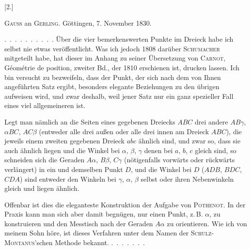 
\begin{center}
[2.]
\end{center}

\begin{center}
\textsc{Gauss} an \textsc{Gerling}. Göttingen, 7. November 1830.
\end{center}

\indent\mbox{. . . . . . . . . .} Über die vier bemerkenswerten Punkte im Dreieck
habe ich selbst nie etwas veröffentlicht. Was ich jedoch 1808 darüber
\textsc{Schumacher} mitgeteilt habe, hat dieser im Anhang zu seiner
Übersetzung von \textsc{Carnot}, Géométrie de position, zweiter
Bd., der 1810 erschienen ist, drucken lassen. Ich bin versucht zu bezweifeln, dass
der Punkt, der sich nach dem von Ihnen angeführten Satz ergibt,
besonders elegante Beziehungen zu den übrigen aufweisen wird, und zwar
deshalb, weil jener Satz nur ein ganz spezieller Fall eines viel
allgemeineren ist.

Legt man nämlich an die Seiten eines gegebenen Dreiecks $ABC$
drei andere $AB\gamma$, $\alpha BC$, $AC\beta$ (entweder alle drei
außen oder alle drei innen am Dreieck
$ABC$), die jeweils einem zweiten gegebenen Dreieck $abc$ ähnlich
sind, und zwar so, dass sie auch ähnlich liegen und die Winkel bei
$\alpha$, $\beta$, $\gamma$ denen bei $a$, $b$, $c$ gleich sind, so
schneiden sich die Geraden $A\alpha$, $B\beta$, $C\gamma$
(nötigenfalls vorwärts oder rückwärts verlängert) in ein und demselben Punkt
$D$, und die Winkel bei $D$ ($ADB$, $BDC$, $CDA$) sind
entweder den Winkeln bei $\gamma$, $\alpha$, $\beta$ selbst oder ihren
Nebenwinkeln gleich und liegen ähnlich.

Offenbar ist dies die eleganteste Konstruktion der
Aufgabe von \textsc{Pothenot}. In der Praxis kann man sich aber damit begnügen,
nur einen Punkt, z.\,B. $\alpha$, zu konstruieren und den Messtisch nach
der Geraden $A\alpha$ zu orientieren. Wie ich von meinem Sohn höre, ist
dieses Verfahren unter dem Namen der \textsc{Schulz-Montanus}'schen Methode
bekannt. \mbox{. . . . . . .}

